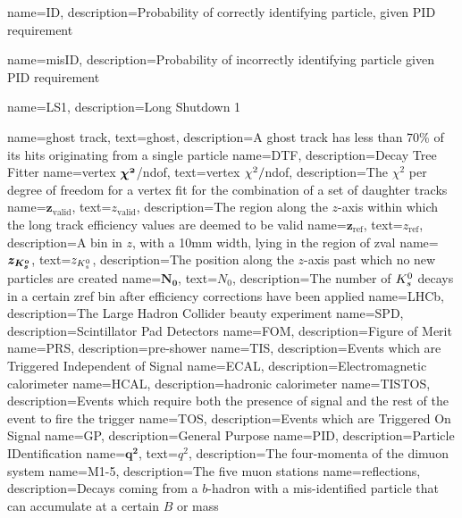 
{
	name=ID,
		description={Probability of correctly identifying particle, given PID requirement}
}

{
	name=misID,
		description={Probability of incorrectly identifying particle given PID requirement}
}

{
	name=LS1,
		description={Long Shutdown 1}
}


{
	name=ghost track,
		text=ghost,
		description={A ghost track has less than 70\% of its hits originating from a single particle} 
}
{
	name=DTF,
		description={Decay Tree Fitter} 
}
{
	name=vertex $\mathbold{\chisq}$/ndof,
		text=vertex $\chi^2/$ndof,
		description={The $\chi^{2}$ per degree of freedom for a vertex fit for the combination of a set of daughter tracks} 
}
{
	name=$\mathbold{z_{\mathrm{valid}}}$,
		text=$z_{\mathrm{valid}}$,
		description={The region along the $z$-axis within which the long track efficiency values are deemed to be valid} 
}
{
	name=$\mathbold{z_{\mathrm{ref}}}$,
		text=$z_{\mathrm{ref}}$,
		description={A bin in $z$, with a 10mm width, lying in the region of \gls{zval}} 
}
{
	name=$\mathbold{z_{\KS}}$,
		text=$z_{{{K}^0_{s}}}$,
		description={The position along the $z$-axis past which no new \KS particles are created} 
}
{
	name=$\mathbold{N_{0}}$,
		text=$N_{0}$,
		description={The number of ${{K}^0_{s}}$ decays in a certain \gls{zref} bin after efficiency corrections have been applied}}
{
	name=LHCb,
		description={The Large Hadron Collider beauty experiment}
}
{
	name=SPD,
		description={Scintillator Pad Detectors}
}
{
	name=FOM,
		description={Figure of Merit}
}                                    
{
	name=PRS,
		description={pre-shower}
}                                    
{
	name=TIS,
		description={Events which are Triggered Independent of Signal}
}
{
	name=ECAL,
		description={Electromagnetic calorimeter}
}
{
	name=HCAL,
		description={hadronic calorimeter}
}                                    
{
	name=TISTOS,
		description={Events which require both the presence of signal and the rest of the event to fire the trigger}
}                                    
{
	name=TOS,
		description={Events which are Triggered On Signal}
}                                    
{
	name=GP,
		description={General Purpose}                                 }                  
{
	name=PID,
		description={Particle IDentification} 
}                 
{
	name=$\mathbold{q^{2}}$,
		text=$q^{2}$,
		description={The four-momenta of the dimuon system}
}
{
	name=M1-5,
		description={The five muon stations}
}
{
	name=reflections,
		description={Decays coming from a $b$-hadron with a mis-identified particle that can accumulate at a certain $B$ or \Lb mass}
}

